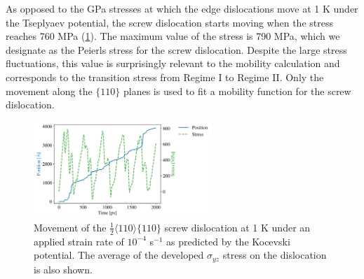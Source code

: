 \documentclass[applsci,article,submit,pdftex,moreauthors]{Definitions/mdpi}
\newcommand{\?}{\stackrel{?}{=}}
\begin{document}
As opposed to the GPa stresses at which the edge dislocations move at 1 K under the Tseplyaev potential, the screw dislocation starts moving when the stress reaches 760 MPa (\cref{Fig:Screw1K}). The maximum value of the stress is 790 MPa, which we designate as the Peierls stress for the screw dislocation. Despite the large stress fluctuations, this value is surprisingly relevant to the mobility calculation and corresponds to the transition stress from Regime I to Regime II. Only the movement along the $\{110\}$ planes is used to fit a mobility function for the screw dislocation.

\begin{figure}[h!]
    \centering
    \includegraphics[width=0.6\textwidth]{Position-Stress-ScrewEAM110.png}
    \caption{Movement of the $\frac{1}{2} \langle 110 \rangle \{110\}$ screw dislocation at 1 K under an applied strain rate of $10^{-4}$ s$^{-1}$ as predicted by the Kocevski potential. The average of the developed $\sigma_{yz}$ stress on the dislocation is also shown.}
    \label{Fig:Screw1K}
\end{figure}
\end{document}
